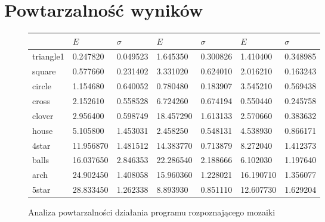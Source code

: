 \documentclass[a4paper,12pt,leqno]{article}
\begin{document}
\section{Powtarzalność wyników}

\begin{figure}\centering
\footnotesize
\vspace{-1.2em}
\vspace{-1.2em}
\vspace{.5em}
\begin{tabular}{|l|ll|ll|ll|}\hline
          & $E$       & $\sigma$ & $E$       & $\sigma$ & $E$       & $\sigma$ \\ \hline
triangle1 &  0.247820 & 0.049523 &  1.645350 & 0.300826 &  1.410400 & 0.348985 \\
square    &  0.577660 & 0.231402 &  3.331020 & 0.624010 &  2.016210 & 0.163243 \\
circle    &  1.154680 & 0.640052 &  0.780480 & 0.183907 &  3.545210 & 0.569438 \\
cross     &  2.152610 & 0.558528 &  6.724260 & 0.674194 &  0.550440 & 0.245758 \\
clover    &  2.956400 & 0.598749 & 18.457290 & 1.613133 &  2.570660 & 0.383632 \\
house     &  5.105800 & 1.453031 &  2.458250 & 0.548131 &  4.538930 & 0.866171 \\
4star     & 11.956870 & 1.481512 & 14.383770 & 0.713879 &  8.272040 & 1.412373 \\
balls     & 16.037650 & 2.846353 & 22.286540 & 2.188666 &  6.102030 & 1.197640 \\
arch      & 24.902450 & 1.408058 & 15.960360 & 1.228021 & 16.190710 & 1.356077 \\
5star     & 28.833450 & 1.262338 &  8.893930 & 0.851110 & 12.607730 & 1.629204 \\ \hline
\end{tabular}
\normalsize\caption{Analiza powtarzalności działania programu rozpoznającego mozaiki}
\end{figure}
\end{document}
